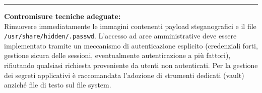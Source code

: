 \documentclass[11pt]{report}
\begin{document}
\begin{tcolorbox}[colback=gray!5, colframe=headerblue, arc=3pt, boxrule=0.8pt, breakable]
		\vspace{0.2cm}\hrule\vspace{0.2cm}
		
		\textbf{Contromisure tecniche adeguate:}\\
		Rimuovere immediatamente le immagini contenenti payload steganografici e il file \texttt{/usr/share/hidden/.passwd}. L'accesso ad aree amministrative deve essere implementato tramite un meccanismo di autenticazione esplicito (credenziali forti, gestione sicura delle sessioni, eventualmente autenticazione a più fattori), rifiutando qualsiasi richiesta proveniente da utenti non autenticati. Per la gestione dei segreti applicativi è raccomandata l'adozione di strumenti dedicati (vault) anziché file di testo sul file system.
	\end{tcolorbox}
	
\end{document}
